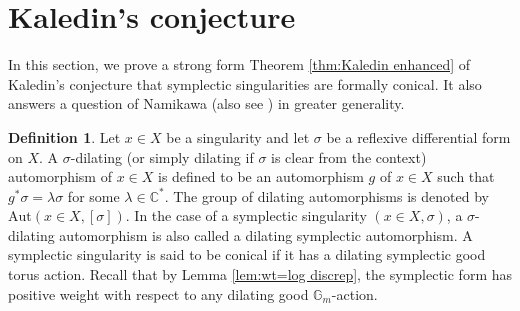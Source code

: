 \documentclass[12pt]{amsart}
\newtheorem{thm}[prop]{Theorem}
\theoremstyle{definition}
\newtheorem{defn}[prop]{Definition}
\newcommand{\bC}{\mathbb{C}}
\newcommand{\bG}{\mathbb{G}}
\newcommand{\Aut}{\mathrm{Aut}}
\numberwithin{equation}{section}
\begin{document}
\section{Kaledin's conjecture} \label{s-Kaledin}

In this section, we prove a strong form Theorem \ref{thm:Kaledin enhanced} of Kaledin's conjecture that symplectic singularities are formally conical. It also answers a question of Namikawa \cite[Page 3]{Namikawa-torichyperkahler}  (also see \cite{Namikawa-torichyperkahlerII}) in greater generality.




\begin{defn} \label{def:dilating auto}
Let $x\in X$ be a singularity and let $\sigma$ be a reflexive differential form on $X$. A $\sigma$-dilating (or simply dilating if $\sigma$ is clear from the context) automorphism of $x\in X$ is defined to be an automorphism $g$ of $x\in X$ such that $g^*\sigma = \lambda\sigma$ for some $\lambda\in \bC^*$. The group of dilating automorphisms is denoted by $\Aut(x\in X,[\sigma])$. In the case of a symplectic singularity $(x\in X,\sigma)$, a $\sigma$-dilating automorphism is also called a dilating symplectic automorphism. A symplectic singularity is said to be conical if it has a dilating symplectic good torus action. Recall that by Lemma \ref{lem:wt=log discrep}, the symplectic form has positive weight with respect to any dilating good $\bG_m$-action.
\end{defn}
\end{document}
